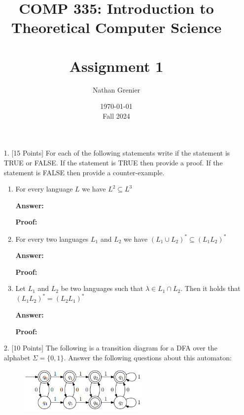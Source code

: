 \documentclass[12pt]{article}
\title{COMP 335: Introduction to Theoretical Computer Science\\
\ \\
Assignment 1}
\author{Nathan Grenier}
\date{\today \\ Fall 2024}
\begin{document}
\maketitle

\newpage

\begin{enumerate}

	\item[1.] [15 Points] For each of the following statements write if the statement is TRUE or FALSE. If the statement is TRUE then provide a proof. If the statement is FALSE then provide a counter-example.

	      \begin{enumerate}

		      \item For every language $L$ we have $L^2 \subseteq L^3$

		            \noindent \textbf{Answer:}

		            \noindent \textbf{Proof:}

		      \item For every two languages $L_1$ and $L_2$ we have $(L_1 \cup L_2)^* \subseteq (L_1L_2)^*$

		            \noindent \textbf{Answer:}

		            \noindent \textbf{Proof:}

		      \item Let $L_1$ and $L_2$ be two languages such that $\lambda \in L_1 \cap L_2$. Then it holds that $(L_1L_2)^* = (L_2L_1)^*$

		            \noindent \textbf{Answer:}

		            \noindent \textbf{Proof:}

	      \end{enumerate}

	      \newpage

	\item[2.] [10 Points] The following is a transition diagram for a DFA over the alphabet $\Sigma = \{0,1\}$. Answer the following questions about this automaton:

	      \begin{figure}[h!]
		      \centering
		      \includegraphics[width=0.6\textwidth]{img/q2_automata.png}
	      \end{figure}


\end{enumerate}
\end{document}
